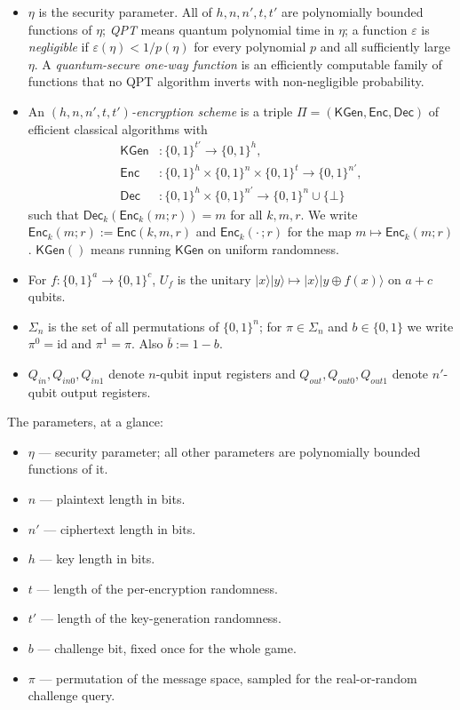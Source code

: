 \documentclass{aicr-conjecture}
\newcommand{\KGen}{\mathsf{KGen}}
\newcommand{\Enc}{\mathsf{Enc}}
\newcommand{\Dec}{\mathsf{Dec}}
\newcommand{\ket}[1]{|#1\rangle}
\begin{document}
\begin{itemize}
  \item $\eta$ is the security parameter. All of $h,n,n',t,t'$ are
    polynomially bounded functions of $\eta$; \emph{QPT} means quantum
    polynomial time in $\eta$; a function $\varepsilon$ is
    \emph{negligible} if $\varepsilon(\eta)<1/p(\eta)$ for every
    polynomial $p$ and all sufficiently large $\eta$. A
    \emph{quantum-secure one-way function} is an efficiently computable
    family of functions that no QPT algorithm inverts with
    non-negligible probability.
  \item An \emph{$(h,n,n',t,t')$-encryption scheme} is a triple
    $\Pi=(\KGen,\Enc,\Dec)$ of efficient classical algorithms with
    \begin{align*}
      \KGen&\colon\{0,1\}^{t'}\to\{0,1\}^{h},\\
      \Enc&\colon\{0,1\}^{h}\times\{0,1\}^{n}\times\{0,1\}^{t}
        \to\{0,1\}^{n'},\\
      \Dec&\colon\{0,1\}^{h}\times\{0,1\}^{n'}
        \to\{0,1\}^{n}\cup\{\bot\}
    \end{align*}
    such that $\Dec_k(\Enc_k(m;r))=m$ for all $k,m,r$. We write
    $\Enc_k(m;r):=\Enc(k,m,r)$ and $\Enc_k(\cdot\,;r)$ for the map
    $m\mapsto\Enc_k(m;r)$. $\KGen()$ means running $\KGen$ on uniform
    randomness.
  \item For $f:\{0,1\}^{a}\to\{0,1\}^{c}$, $U_f$ is the unitary
    $\ket{x}\ket{y}\mapsto\ket{x}\ket{y\oplus f(x)}$ on $a+c$ qubits.
  \item $\Sigma_n$ is the set of all permutations of $\{0,1\}^{n}$; for
    $\pi\in\Sigma_n$ and $b\in\{0,1\}$ we write $\pi^{0}=\mathrm{id}$
    and $\pi^{1}=\pi$. Also $\bar b:=1-b$.
  \item $Q_{in},Q_{in0},Q_{in1}$ denote $n$-qubit input registers and
    $Q_{out},Q_{out0},Q_{out1}$ denote $n'$-qubit output registers.
\end{itemize}

The parameters, at a glance:

\begin{itemize}
  \item $\eta$ --- security parameter; all other parameters are
    polynomially bounded functions of it.
  \item $n$ --- plaintext length in bits.
  \item $n'$ --- ciphertext length in bits.
  \item $h$ --- key length in bits.
  \item $t$ --- length of the per-encryption randomness.
  \item $t'$ --- length of the key-generation randomness.
  \item $b$ --- challenge bit, fixed once for the whole game.
  \item $\pi$ --- permutation of the message space, sampled for the
    real-or-random challenge query.
\end{itemize}
\end{document}
